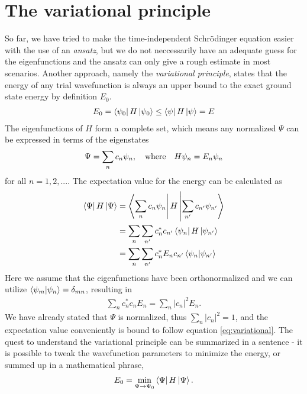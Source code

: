\section{The variational principle}
\label{appendix:variational-principle}
So far, we have tried to make the time-independent Schrödinger equation easier with the use of an \textit{ansatz}, but we do not neccessarily have an adequate guess for the eigenfunctions and the ansatz can only give a rough estimate in most scenarios. Another approach, namely the \textit{variational principle}, states that the energy of any trial wavefunction is always an upper bound to the exact ground state energy by definition $E_0$.
\begin{align}
  E_0 = \bra{\psi_0 } H \ket{\psi_0} \leq \bra{\psi}H\ket{\psi} = E
  \label{eq:variational}
\end{align}
The eigenfunctions of $H$ form a complete set, which means any normalized $\Psi$ can be expressed in terms of the eigenstates
\begin{align}
  \Psi = \sum_n c_n \psi_n, \quad \textnormal{where} \quad H\psi_n = E_n \psi_n
\end{align}
for all $n = 1,2, ...$. The expectation value for the energy can be calculated as
\begin{align*}
  \bra{\Psi}H\ket{\Psi} &= \bra{\sum_{n}c_n \psi_n} H \ket{\sum_{n'} c_{n'}\psi_{n'}} \\
  &= \sum_n \sum_{n'} c_{n}^* c_{n'} \bra{\psi_n}H\ket{\psi_{n'}} \\
  &= \sum_n \sum_{n'} c_{n}^* E_n c_{n'} \bra{\psi_{n}}\ket{\psi_{n'}} \\
\end{align*}
Here we assume that the eigenfunctions have been orthonormalized and we can utilize $\bra{\psi_{m}}\ket{\psi_{n}}=\delta_{mn}$, resulting in
\begin{align*}
  \sum_n c_n^*c_n E_n = \sum_n \lvert c_n \rvert^2 E_n.
\end{align*}
We have already stated that $\Psi$ is normalized, thus $\sum_n \lvert c_n \rvert ^2 = 1 $, and the expectation value conveniently is bound to follow equation \ref{eq:variational}.
The quest to understand the variational principle can be summarized in a sentence - it is possible to tweak the wavefunction parameters to minimize the energy, or summed up in a mathematical phrase,
\begin{align}
  E_0 = \min_{\Psi \rightarrow \Psi_0} \bra{\Psi}H\ket{\Psi}.
\end{align}

